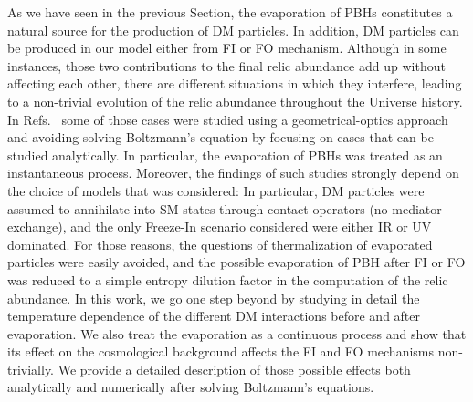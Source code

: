 \documentclass[aps,prd,reprint,twocolumn,preprintnumbers,floatfix,nofootinbib]{revtex4-1}
\begin{document}
As we have seen in the previous Section, the evaporation of PBHs constitutes a natural source for the production of DM particles. In addition, DM particles can be produced in our model either from FI or FO mechanism. Although in some instances, those two contributions to the final relic abundance add up without affecting each other, there are different situations in which they interfere, leading to a non-trivial evolution of the relic abundance throughout the Universe history. In Refs.~\cite{Bernal:2020bjf, Bernal:2020ili, Gondolo:2020uqv} some of those cases were studied using a geometrical-optics approach and avoiding solving Boltzmann's equation by focusing on cases that can be studied analytically. In particular, the evaporation of PBHs was treated as an instantaneous process.
Moreover, the findings of such studies strongly depend on the choice of models that was considered: In particular, DM particles were assumed to annihilate into SM states through contact operators (no mediator exchange), and the only Freeze-In scenario considered were either IR or UV dominated. For those reasons, the questions of thermalization of evaporated particles were easily avoided, and the possible evaporation of PBH after FI or FO was reduced to a simple entropy dilution factor in the computation of the relic abundance. In this work, we go one step beyond by studying in detail the temperature dependence of the different DM interactions before and after evaporation. We also treat the evaporation as a continuous process and show that its effect on the cosmological background affects the FI and FO mechanisms non-trivially. We provide a detailed description of those possible effects both analytically and numerically after solving Boltzmann's equations.
\end{document}
